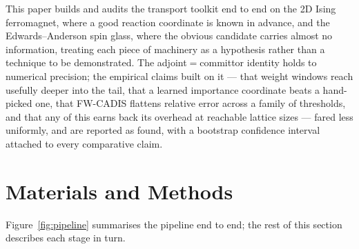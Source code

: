 \documentclass[a4paper,fleqn]{cas-sc}
\begin{document}
	This paper builds and audits the transport toolkit end to end on the 2D Ising ferromagnet,
	where a good reaction coordinate is known in advance, and the Edwards--Anderson spin glass,
	where the obvious candidate carries almost no information, treating each piece of machinery as
	a hypothesis rather than a technique to be demonstrated. The adjoint$=$committor identity
	holds to numerical precision; the empirical claims built on it --- that weight windows reach
	usefully deeper into the tail, that a learned importance coordinate beats a hand-picked one,
	that FW-CADIS flattens relative error across a family of thresholds, and that any of this
	earns back its overhead at reachable lattice sizes --- fared less uniformly, and are reported
	as found, with a bootstrap confidence interval attached to every comparative claim.
	
	\FloatBarrier
	
	\section{Materials and Methods}\label{sec:methods}
	
	Figure~\ref{fig:pipeline} summarises the pipeline end to end; the rest of this section
	describes each stage in turn.
	
\end{document}
